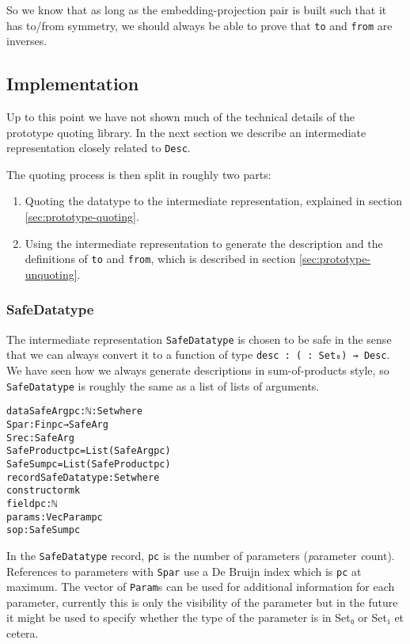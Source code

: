 So we know that as long as the embedding-projection pair is built such
that it has to/from symmetry, we should always be able to prove that
\texttt{to} and \texttt{from} are inverses.

\subsection{Implementation}\label{sec:prototype-implementation}

Up to this point we have not shown much of the technical
details of the prototype quoting library.
In the next section we describe an intermediate representation closely
related to \texttt{Desc}.

The quoting process is then split in roughly two parts:
\begin{enumerate}
\item Quoting the datatype to the intermediate representation,
  explained in section \ref{sec:prototype-quoting}.
\item Using the intermediate representation to generate the
  description and the definitions of \texttt{to} and \texttt{from},
  which is described in section \ref{sec:prototype-unquoting}.
\end{enumerate}

\subsubsection{SafeDatatype}\label{sec:prototype-safedatatype}

The intermediate representation
\texttt{SafeDatatype} is chosen to
be safe in the sense that we can always convert it to a function of
type \texttt{desc : ( : Set₀) → Desc}.
We have seen how we always generate descriptions in sum-of-products
style, so \texttt{SafeDatatype} is roughly the same as a list of lists
of arguments.

\begin{alltt}
data SafeArg {pc : ℕ} : Set where
  Spar : Fin pc → SafeArg
  Srec : SafeArg
SafeProduct {pc} = List (SafeArg {pc})
SafeSum {pc} = List (SafeProduct {pc})
record SafeDatatype : Set where
  constructor mk
  field pc : ℕ
        params : Vec Param pc
        sop : SafeSum {pc}
\end{alltt}

In the \texttt{SafeDatatype} record, \texttt{pc} is the number of
parameters (\emph{p}arameter \emph{c}ount).
References to parameters with \texttt{Spar} use a De Bruijn index
which is \texttt{pc} at maximum.
The vector of \texttt{Param}s can be used for additional information
for each parameter, currently this is only the visibility of the
parameter but in the future it might be used to specify whether the
type of the parameter is in Set₀ or Set₁ et cetera.

